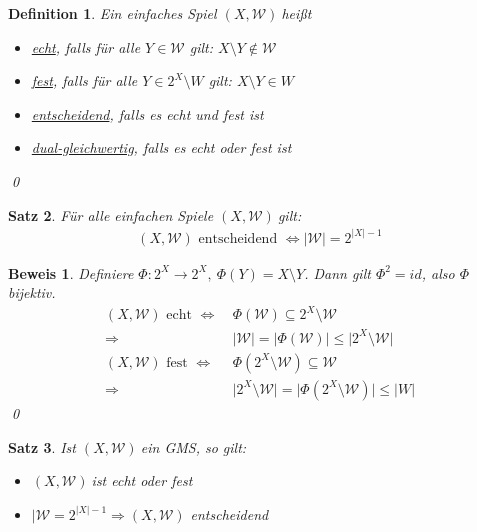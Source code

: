 \documentclass[ngerman]{scrartcl}
\theoremstyle{custom}
\newtheorem{mdef}{Definition} \numberwithin{mdef}{subsection}
\newtheorem{ms}[mdef]{Satz}
\newtheorem*{bw}{Beweis}
\newcommand{\0}{\mathbf{0}}
\newcommand{\1}{\mathbf{L}}
\newcommand{\sg}{$(X,\mathcal{W})~$}
\newcommand{\W}{\mathcal{W}}
\begin{document}
\begin{mdef}
Ein einfaches Spiel \sg hei\ss t 
\begin{itemize}
\item[(1)] \underline{echt}, falls f\"ur alle $Y \in \W$ gilt: $X
  \setminus Y \not \in \W$
\item[(2)] \underline{fest}, falls f\"ur alle $Y \in 2^X \setminus W$ gilt: $X
  \setminus Y \in W$
\item[(3)] \underline{entscheidend}, falls es echt \emph{und}
  fest ist
\item[(4)] \underline{dual-gleichwertig}, falls es echt \emph{oder}
  fest ist
\end{itemize}
\qed
\end{mdef}

\begin{ms}
F\"ur alle einfachen Spiele \sg gilt:
\begin{align*}
(X, \W) \text{ entscheidend } \Leftrightarrow \vert \W \vert =
2^{\vert X \vert -1}
\end{align*}
\end{ms}

\begin{bw}
Definiere $\Phi: 2^X \rightarrow 2^X, ~\Phi(Y) = X \setminus Y$. Dann
gilt $\Phi^2 = id$, also $\Phi$ bijektiv.
\begin{align*}
(X,\W) \text{ echt } \Leftrightarrow&~ \Phi(\W) \subseteq 2^X \setminus \W\\
\Rightarrow&~ \vert \W \vert = \vert \Phi(\W) \vert \leq \vert 2^X
\setminus \W \vert\\
(X,\W) \text{ fest } \Leftrightarrow&~ \Phi(2^X \setminus \W)
\subseteq \W\\
\Rightarrow&~ \vert 2^X \setminus \W \vert = \vert \Phi(2^X \setminus
\W) \vert
\leq \vert W \vert
\end{align*}
\qed
\end{bw}

\begin{ms}
Ist \sg ein GMS, so gilt:
\begin{itemize}
\item[(1)] \sg ist echt oder fest
\item[(2)] $\vert \W = 2^{\vert X \vert -1} \Rightarrow (X,\W)$
  entscheidend
\end{itemize}
\end{ms}
\end{document}
